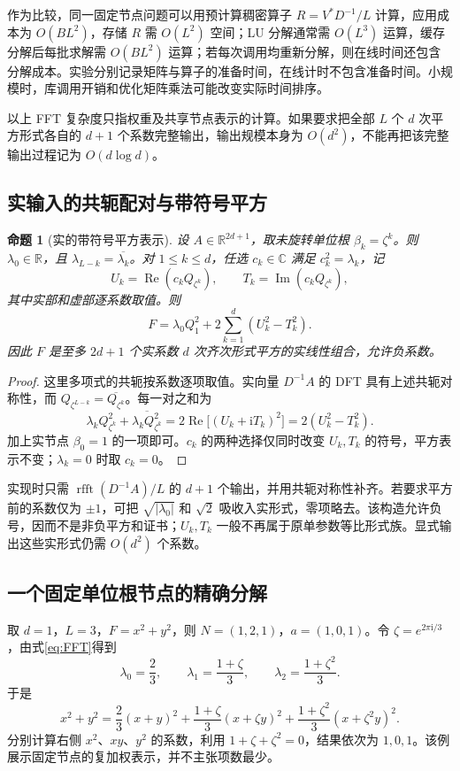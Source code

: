 \documentclass[UTF8,a4paper,zihao=-4,fontset=windows]{ctexart}
\theoremstyle{chinese}
\newtheorem{proposition}[theorem]{命题}
\numberwithin{equation}{section}
\newcommand{\C}{\mathbb C}
\begin{document}
作为比较，同一固定节点问题可以用预计算稠密算子 $R=V^*D^{-1}/L$ 计算，应用成本为 $O(BL^2)$，存储 $R$ 需 $O(L^2)$ 空间；LU 分解通常需 $O(L^3)$ 运算，缓存分解后每批求解需 $O(BL^2)$ 运算；若每次调用均重新分解，则在线时间还包含分解成本。实验分别记录矩阵与算子的准备时间，在线计时不包含准备时间。小规模时，库调用开销和优化矩阵乘法可能改变实际时间排序。

以上 FFT 复杂度只指权重及共享节点表示的计算。如果要求把全部 $L$ 个 $d$ 次平方形式各自的 $d+1$ 个系数完整输出，输出规模本身为 $O(d^2)$，不能再把该完整输出过程记为 $O(d\log d)$。

\subsection{实输入的共轭配对与带符号平方}
\begin{proposition}[实的带符号平方表示]\label{prop:real}
设 $A\in\mathbb R^{2d+1}$，取未旋转单位根 $\beta_k=\zeta^k$。则 $\lambda_0\in\mathbb R$，且 $\lambda_{L-k}=\overline{\lambda_k}$。对 $1\le k\le d$，任选 $c_k\in\C$ 满足 $c_k^2=\lambda_k$，记
\[
U_k=\operatorname{Re}(c_kQ_{\zeta^k}),\qquad
T_k=\operatorname{Im}(c_kQ_{\zeta^k}),
\]
其中实部和虚部逐系数取值。则
\begin{equation}\label{eq:real-squares}
F=\lambda_0 Q_1^2+2\sum_{k=1}^{d}(U_k^2-T_k^2).
\end{equation}
因此 $F$ 是至多 $2d+1$ 个实系数 $d$ 次齐次形式平方的实线性组合，允许负系数。
\end{proposition}
\begin{proof}
这里多项式的共轭按系数逐项取值。实向量 $D^{-1}A$ 的 DFT 具有上述共轭对称性，而 $Q_{\zeta^{L-k}}=\overline{Q_{\zeta^k}}$。每一对之和为
\[
\lambda_k Q_{\zeta^k}^2+\overline{\lambda_k Q_{\zeta^k}^2}
=2\operatorname{Re}\bigl[(U_k+\mathrm i T_k)^2\bigr]=2(U_k^2-T_k^2).
\]
加上实节点 $\beta_0=1$ 的一项即可。$c_k$ 的两种选择仅同时改变 $U_k,T_k$ 的符号，平方表示不变；$\lambda_k=0$ 时取 $c_k=0$。
\end{proof}

实现时只需 $\operatorname{rfft}(D^{-1}A)/L$ 的 $d+1$ 个输出，并用共轭对称性补齐。若要求平方前的系数仅为 $\pm1$，可把 $\sqrt{|\lambda_0|}$ 和 $\sqrt2$ 吸收入实形式，零项略去。该构造允许负号，因而不是非负平方和证书；$U_k,T_k$ 一般不再属于原单参数等比形式族。显式输出这些实形式仍需 $O(d^2)$ 个系数。

\subsection{一个固定单位根节点的精确分解}
取 $d=1$，$L=3$，$F=x^2+y^2$，则 $N=(1,2,1)$，$a=(1,0,1)$。令 $\zeta=e^{2\pi\mathrm i/3}$，由式\eqref{eq:FFT}得到
\[
\lambda_0=\frac23,\qquad
\lambda_1=\frac{1+\zeta}{3},\qquad
\lambda_2=\frac{1+\zeta^2}{3}.
\]
于是
\begin{equation}\label{eq:small}
x^2+y^2=\frac23(x+y)^2+
\frac{1+\zeta}{3}(x+\zeta y)^2+
\frac{1+\zeta^2}{3}(x+\zeta^2y)^2.
\end{equation}
分别计算右侧 $x^2$、$xy$、$y^2$ 的系数，利用 $1+\zeta+\zeta^2=0$，结果依次为 $1,0,1$。该例展示固定节点的复加权表示，并不主张项数最少。
\end{document}

